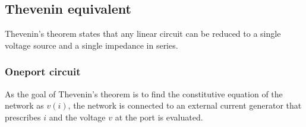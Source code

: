 \documentclass[letterpaper,10pt,italian]{jupyterBook}
\begin{document}
\subsection{Thevenin equivalent}
\label{\detokenize{ch/electrical-engineering-networks:thevenin-equivalent}}\label{\detokenize{ch/electrical-engineering-networks:classical-electromagnetism-electrical-engineering-newtork-analysis-thevenin}}
\sphinxAtStartPar
{} Thevenin’s theorem states that any linear circuit can be reduced to a single voltage source and a single impedance in series.


\subsubsection{One\sphinxhyphen{}port circuit}
\label{\detokenize{ch/electrical-engineering-networks:one-port-circuit}}\label{\detokenize{ch/electrical-engineering-networks:classical-electromagnetism-electrical-engineering-newtork-analysis-thevenin-1-port}}
\sphinxAtStartPar
As the goal of Thevenin’s theorem is to find the constitutive equation of the network as \(v(i)\), the network is connected to an external current generator that prescribes \(i\) and the voltage \(v\) at the port is evaluated.
\end{document}
